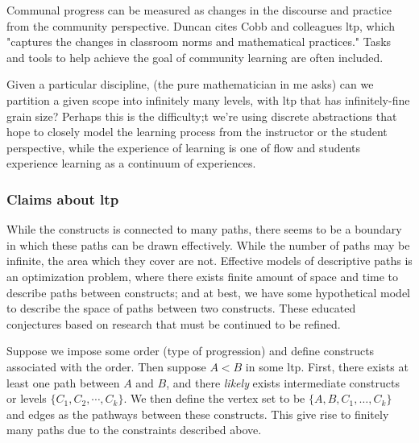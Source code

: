 \documentclass{TC}
\begin{document}
\begin{mdframed}
\begin{definition}
Communal progress can be measured as changes in the discourse and practice from the community perspective. Duncan cites Cobb and colleagues \gls{ltp}, which "captures the changes in classroom norms and mathematical practices." Tasks and tools to help achieve the goal of community learning are often included. 
\end{definition}
\end{mdframed}
\begin{remark}
Given a particular discipline, (the pure mathematician in me asks) can we partition a given scope into infinitely many levels, with \gls{ltp} that has infinitely-fine grain size? Perhaps this is the difficulty;t we're using discrete abstractions that hope to closely model the learning process from the instructor or the student perspective, while the experience of learning is one of flow and students experience learning as a continuum of experiences.
\end{remark}

\subsubsection{Claims about \gls{ltp}}
While the constructs is connected to many paths, there seems to be a boundary in which these paths can be drawn effectively. While the number of paths may be infinite, the area which they cover are not. Effective models of descriptive paths is an optimization problem, where there exists finite amount of space and time to describe paths between constructs; and at best, we have some hypothetical model to describe the space of paths between two constructs. These educated conjectures based on research that must be continued to be refined.

\begin{conjecture}
Suppose we impose some order (type of progression) and define constructs associated with the order. Then suppose $A<B$ in some \gls{ltp}. First, there exists at least one path between $A$ and $B$, and there \emph{likely} exists intermediate constructs or levels $\{C_1, C_2, \cdots, C_k\}$. We then define the vertex set to be $\{A, B, C_1, \ldots,C_k\}$ and edges as the pathways between these constructs. This give rise to finitely many paths due to the constraints described above. 
\end{conjecture}
\end{document}
